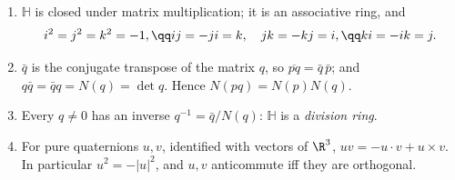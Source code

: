 \begin{proposition}\label{prop:quat}
\begin{enumerate}[label=(\alph*)]
\item $\mathbb H$ is closed under matrix multiplication; it is an associative ring, and
\[
\begin{gathered}i^2=j^2=k^2=-1,\qq ij=-ji=k,\quad jk=-kj=i,\qq ki=-ik=j.\end{gathered}
\]
\item $\bar q$ is the conjugate transpose of the matrix $q$, so $\overline{pq}=\bar q\,\bar p$; and $q\bar q=\bar qq=N(q)=\det q$. Hence $N(pq)=N(p)N(q)$.
\item Every $q\ne0$ has an inverse $q^{-1}=\bar q/N(q)$: $\mathbb H$ is a \emph{division ring}.
\item For pure quaternions $u,v$, identified with vectors of $\R^3$, $uv=-u\cdot v+u\times v$. In particular $u^2=-|u|^2$, and $u,v$ anticommute iff they are orthogonal.
\end{enumerate}
\end{proposition}
